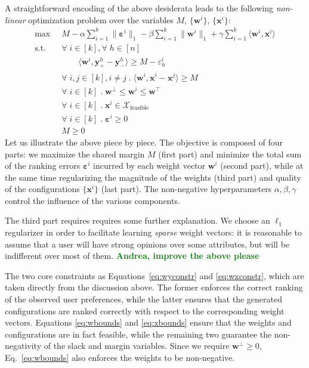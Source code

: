 \documentclass{article}
\renewcommand\[{\begin{equation}}
\renewcommand\]{\end{equation}}
\newcommand{\calvar}[1]{\ensuremath{\mathcal{#1}}}
\newcommand{\calX}{\calvar{X}}
\newcommand{\vecvar}[1]{\ensuremath{\boldsymbol{#1}}}
\newcommand{\vw}{\vecvar{w}}
\newcommand{\vx}{\vecvar{x}}
\newcommand{\vy}{\vecvar{y}}
\newcommand{\veps}{\vecvar{\varepsilon}}
\newcommand{\stefano}[1]{{\bf \textcolor{green}{{\fbox{Stefano:} #1}}}}
\begin{document}
A straightforward encoding of the above desiderata leads to the following {\em
non-linear} optimization problem over the variables $M$, $\{ \vw^i \}$, $\{ \vx^i \}$:
%
{\footnotesize
\begin{align}
    \max
        & \;\; M - \alpha \sum_{i=1}^k \| \veps^{i} \|_1 - \beta \sum_{i=1}^k \| \vw^{i} \|_1 + \gamma \sum_{i=1}^k \langle \vw^{i}, \vx^{i} \rangle
        \nonumber
    \\
    \text{s.t.}
        & \;\; \forall \; i \in [k], \forall \; h \in [n] \nonumber
    \\
        & \;\; \qquad \langle \vw^{i}, \vy^{h}_+ - \vy^{h}_- \rangle \ge M - \varepsilon^{i}_h \label{eq:wyconstr}
    \\
        & \;\; \forall \; i, j \in [k], i \neq j \;.\; \langle \vw^{i}, \vx^{i} - \vx^{j} \rangle \ge M \label{eq:wxconstr}
    \\
        & \;\; \forall \; i \in [k] \;.\; \vw^\bot \le \vw^{i} \le \vw^\top \label{eq:wbounds}
    \\
        & \;\; \forall \; i \in [k] \;.\; \vx^{i} \in \calX_{\text{feasible}} \label{eq:xbounds}
    \\
        & \;\; \forall \; i \in [k] \;.\; \veps^{i} \ge 0 \nonumber
    \\
        & \;\; M \ge 0 \nonumber
\end{align}
}
%
Let us illustrate the above piece by piece. The objective is composed of four
parts: we maximize the shared margin $M$ (first part) and minimize the total
sum of the ranking errors $\veps^i$ incurred by each weight vector $\vw^{i}$
(second part), while at the same time regularizing the magnitude of the
weights (third part) and quality of the configurations $\{ \vx^{i} \}$ (last
part). The non-negative hyperparameters $\alpha,\beta,\gamma$ control the
influence of the various components.

The third part requires requires some further explanation. We choose an
$\ell_1$ regularizer in order to facilitate learning {\em sparse} weight
vectors: it is reasonable to assume that a user will have strong opinions
over some attributes, but will be indifferent over most of them.
\stefano{Andrea, improve the above please}

The two core constraints as Equations~\ref{eq:wyconstr} and \ref{eq:wxconstr},
which are taken directly from the discussion above. The former enforces the
correct ranking of the observed user preferences, while the latter ensures that
the generated configurations are ranked correctly with respect to the
corresponding weight vectors. Equations \ref{eq:wbounds} and \ref{eq:xbounds}
ensure that the weights and configurations are in fact feasible, while the
remaining two guarantee the non-negativity of the slack and margin variables.
Since we require $\vw^\bot \ge 0$, Eq.~\ref{eq:wbounds} also enforces the
weights to be non-negative.
\end{document}
